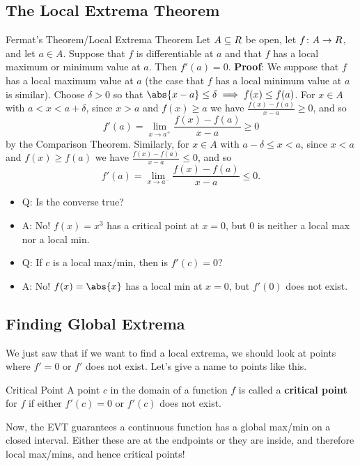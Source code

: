 \subsection{The Local Extrema Theorem}
\begin{Theorem}{Fermat's Theorem/Local Extrema Theorem}{}
    Let $ A\subseteq \relax{R} $ be open, let $ f\colon A\to\relax{R} $, and let $ a\in A $. Suppose that $ f $
    is differentiable at $ a $ and that $ f $ has a local maximum or minimum value at $ a $. Then
    $ f'(a)=0 $.
    \tcblower{}
    \textbf{Proof}: We suppose that $ f $ has a local maximum value at $ a $ (the case that $ f $ has a local minimum
    value at $ a $ is similar). Choose $ \delta>0 $ so that $ \abs{x-a}\le \delta\implies f(x)\le f(a) $. For
    $ x\in A $ with $ a<x<a+\delta $, since $ x>a $ and $ f(x)\ge a $ we have $\frac{f(x)-f(a)}{x-a}\ge 0$,
    and so
    \[ f'(a)=\lim\limits_{{x} \to {a^+}}\frac{f(x)-f(a)}{x-a}\ge 0 \]
    by the Comparison Theorem. Similarly, for $ x\in A $ with $ a-\delta\le x<a $, since $ x<a $
    and $ f(x)\ge f(a) $ we have $ \frac{f(x)-f(a)}{x-a}\le 0 $, and so
    \[ f'(a)=\lim\limits_{{x} \to {a^-}}\frac{f(x)-f(a)}{x-a}\le 0. \]
\end{Theorem}
\begin{itemize}
    \item Q\@: Is the converse true?
    \item A\@: No! $ f(x)=x^3 $ has a critical point at $ x=0 $, but $ 0 $ is neither a local max nor a local min.
    \item Q\@: If $ c $ is a local max/min, then is $ f'(c)=0 $?
    \item A\@: No! $ f(x)=\abs{x} $ has a local min at $ x=0 $, but $ f'(0) $ does not exist.
\end{itemize}
\subsection*{Finding Global Extrema}
We just saw that if we want to find a local extrema, we should look at points where $ f'=0 $ or $ f' $ does not exist.
Let's give a name to points like this.
\begin{Definition}{Critical Point}{}
    A point $c$ in the domain of a function $f$ is called a \textbf{critical point} for $f$ if either
    $ f'(c)=0 $ or $ f'(c) $ does not exist.
\end{Definition}
Now, the EVT guarantees a continuous function
has a global max/min on a closed interval. Either these are at the endpoints or they are inside, and therefore local max/mins,
and hence critical points!

